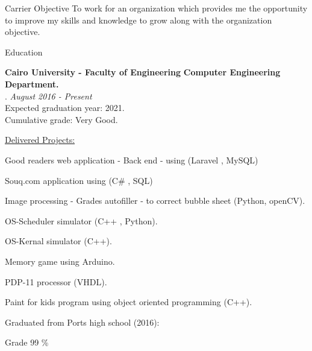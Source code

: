 \documentclass{resume}
\begin{document}

\begin{rSection}{Carrier Objective}
    To work for an organization which provides me the opportunity to improve my skills and knowledge to grow along with the organization objective.
\end{rSection}


\begin{rSection}{Education}

\textbf{Cairo University \-- Faculty of Engineering} \textbf{Computer Engineering Department.} \\. \hfill {\em August 2016 - Present} 
\\ Expected graduation year: 2021.
\\ Cumulative grade: Very Good.\\

\begin{rSubsection}{\underline{Delivered Projects:}}{}{}{}
    \item Good readers web application - Back end - using (Laravel , MySQL)
    \item Souq.com application using (C\# , SQL)
    \item Image processing - Grades autofiller - to correct bubble sheet (Python, openCV).
    \item OS-Scheduler simulator (C++ , Python).
    \item OS-Kernal simulator (C++).
    \item Memory game using Arduino.
    \item PDP-11 processor (VHDL).
    \item Paint for kids program using object oriented programming (C++).
\end{rSubsection}

\begin{rSubsection}{Graduated from Ports high school (2016):}{}{}{}
    \item Grade 99 \%
\end{rSubsection}

\end{rSection}
\end{document}
